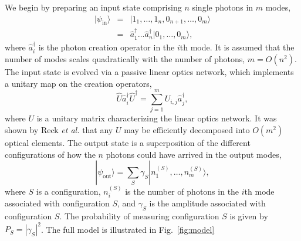 \documentclass[aps,pra,twocolumn,amsmath,amssymb,nofootinbib,superscriptaddress]{revtex4}
\newcommand{\ket}[1]{|#1\rangle}
\begin{document}
We begin by preparing an input state comprising $n$ single photons in $m$ modes,
\begin{eqnarray} \label{eq:input_state}
\ket{\psi_\mathrm{in}} &=& \ket{1_1,\dots,1_n,0_{n+1},\dots,0_m} \nonumber \\
&=& \hat{a}^\dag_1 \dots \hat{a}^\dag_n \ket{0_1,\dots,0_m},
\end{eqnarray}
where $\hat{a}^\dag_i$ is the photon creation operator in the $i$th mode. It is assumed that the number of modes scales quadratically with the number of photons, \mbox{$m=O(n^2)$}. The input state is evolved via a passive linear optics network, which implements a unitary map on the creation operators,
\begin{equation} \label{eq:Utransform}
\hat{U}\hat{a}_i^\dag\hat{U}^\dag = \sum_{j=1}^m U_{i,j} \hat{a}_j^\dag,
\end{equation} 
where $U$ is a unitary matrix characterizing the linear optics network. It was shown by Reck \emph{et al.} \cite{bib:Reck94} that any $U$ may be efficiently decomposed into $O(m^2)$ optical elements. The output state is a superposition of the different configurations of how the $n$ photons could have arrived in the output modes,
\begin{equation} \label{eq:outputState}
\ket{\psi_\mathrm{out}} = \sum_S \gamma_S \ket{n_1^{(S)},\dots,n_m^{(S)}},
\end{equation}
where $S$ is a configuration, $n_i^{(S)}$ is the number of photons in the $i$th mode associated with configuration $S$, and $\gamma_S$ is the amplitude associated with configuration $S$. The probability of measuring configuration $S$ is given by \mbox{$P_S = |\gamma_S|^2$}. The full model is illustrated in Fig.~\ref{fig:model}
\end{document}
